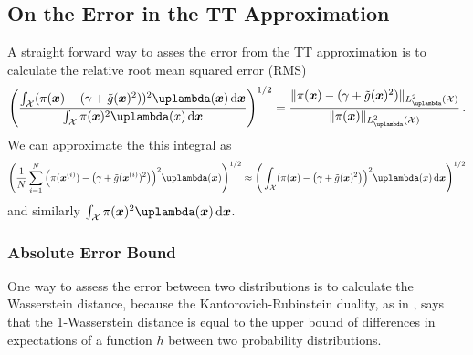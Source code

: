 \subsection{On the Error in the TT Approximation}
A straight forward way to asses the error from the TT approximation is to calculate the relative root mean squared error (RMS)
\begin{align}
	\Bigg( \frac{ \int_{\mathcal{X}} (\pi(\bm{x}) - (\gamma + \tilde{g}(\bm{x})^2))^2 \uplambda(\bm{x}) \diff \bm{x}}{ \int_{\mathcal{X}} \pi(\bm{x})^2 \uplambda(x)  \diff \bm{x} } \Bigg)^{1/2} =	\frac{\lVert 	\pi(\bm{x}) - (\gamma + \tilde{g}(\bm{x})^2)  \rVert_{L^2_{\uplambda}(\mathcal{X})}}{\lVert 	\pi(\bm{x}) \rVert_{L^2_{\uplambda}(\mathcal{X})}  } \, .
\end{align}
We can approximate the this integral as 
\begin{align}
	\Bigg( \frac{1}{N} \sum^{N}_{i =1} \Big(\pi(\bm{x}^{(i)}) - \big(\gamma + \tilde{g}(\bm{x}^{(i)})^2\big)\Big)^2 \uplambda(\bm{x})\Bigg)^{1/2}    \approx \Bigg(  \int_{\mathcal{X}} (\pi(\bm{x}) - \big(\gamma + \tilde{g}(\bm{x})^2\big)\Big)^2 \uplambda(x) \diff \bm{x} \Bigg)^{1/2} 
\end{align}
and similarly $\int_{\mathcal{X}} \pi(\bm{x})^2 \uplambda(\bm{x})  \diff \bm{x}$.


\subsubsection{Absolute Error Bound}
One way to assess the error between two distributions is to calculate the Wasserstein distance, because the Kantorovich-Rubinstein duality, as in \cite{thickstun2019kantorovich, Ambrosio2024Kanta}, says that the 1-Wasserstein distance is equal to the upper bound of differences in expectations of a function $h$ between two probability distributions.

